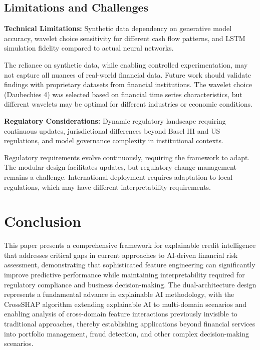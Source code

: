 \documentclass[a4 paper, 11pt,twoside]{article}
\newcommand{\0}{\Bf{0}}
\theoremstyle{definition}
\begin{document}
\subsection{Limitations and Challenges}

\textbf{Technical Limitations:} Synthetic data dependency on generative model accuracy, wavelet choice sensitivity for different cash flow patterns, and LSTM simulation fidelity compared to actual neural networks.

The reliance on synthetic data, while enabling controlled experimentation, may not capture all nuances of real-world financial data. Future work should validate findings with proprietary datasets from financial institutions. The wavelet choice (Daubechies 4) was selected based on financial time series characteristics, but different wavelets may be optimal for different industries or economic conditions.

\textbf{Regulatory Considerations:} Dynamic regulatory landscape requiring continuous updates, jurisdictional differences beyond Basel III and US regulations, and model governance complexity in institutional contexts.

Regulatory requirements evolve continuously, requiring the framework to adapt. The modular design facilitates updates, but regulatory change management remains a challenge. International deployment requires adaptation to local regulations, which may have different interpretability requirements.
\section{Conclusion}

This paper presents a comprehensive framework for explainable credit intelligence that addresses critical gaps in current approaches to AI-driven financial risk assessment, demonstrating that sophisticated feature engineering can significantly improve predictive performance while maintaining interpretability required for regulatory compliance and business decision-making. The dual-architecture design represents a fundamental advance in explainable AI methodology, with the CrossSHAP algorithm extending explainable AI to multi-domain scenarios and enabling analysis of cross-domain feature interactions previously invisible to traditional approaches, thereby establishing applications beyond financial services into portfolio management, fraud detection, and other complex decision-making scenarios.
\end{document}
